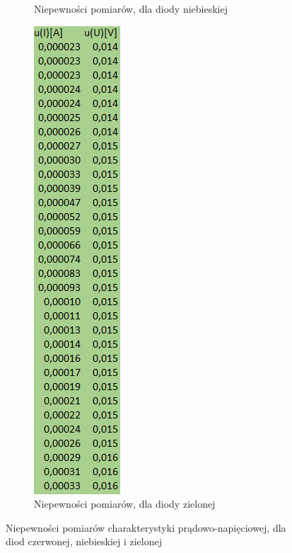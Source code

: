 \documentclass{article}
\begin{document}
\begin{figure}[b!]
\begin{subfigure}[b]{0.15\textwidth}
    \caption{Niepewności pomiarów, dla diody niebieskiej}
  \end{subfigure}
  \begin{subfigure}[b]{0.15\textwidth}
    \includegraphics[width=\linewidth]{Niepewnosci_Dioda_Zielona.png}
    \caption{Niepewności pomiarów, dla diody zielonej}
  \end{subfigure}
  \caption{Niepewności pomiarów charakterystyki prądowo-napięciowej, dla diod czerwonej, niebieskiej i zielonej}
\end{figure}
\newpage
\end{document}
